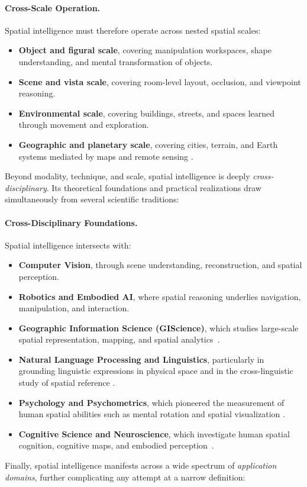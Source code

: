 \paragraph{Cross-Scale Operation.}
Spatial intelligence must therefore operate across nested spatial scales:
\begin{itemize}[leftmargin=2em,itemsep=0.35em]
    \item \textbf{Object and figural scale}, covering manipulation workspaces, shape understanding, and mental transformation of objects.
    \item \textbf{Scene and vista scale}, covering room-level layout, occlusion, and viewpoint reasoning.
    \item \textbf{Environmental scale}, covering buildings, streets, and spaces learned through movement and exploration.
    \item \textbf{Geographic and planetary scale}, covering cities, terrain, and Earth systems mediated by maps and remote sensing \cite{goodchild1992geographical,feng2025survey}.
\end{itemize}
Beyond modality, technique, and scale, spatial intelligence is deeply \emph{cross-disciplinary}.
Its theoretical foundations and practical realizations draw simultaneously from several scientific traditions:



\paragraph{Cross-Disciplinary Foundations.}
Spatial intelligence intersects with:
\begin{itemize}[leftmargin=2em,itemsep=0.35em]
    \item \textbf{Computer Vision}, through scene understanding, reconstruction, and spatial perception.
    \item \textbf{Robotics and Embodied AI}, where spatial reasoning underlies navigation, manipulation, and interaction.
    \item \textbf{Geographic Information Science (GIScience)}, which studies large-scale spatial representation, mapping, and spatial analytics~\cite{goodchild1992geographical,li2025giscience}.
    \item \textbf{Natural Language Processing and Linguistics}, particularly in grounding linguistic expressions in physical space and in the cross-linguistic study of spatial reference \cite{landau1993whence,levinson2003space}.
    \item \textbf{Psychology and Psychometrics}, which pioneered the measurement of human spatial abilities such as mental rotation and spatial visualization \cite{shepard1971mental,uttal2013malleability}.
    \item \textbf{Cognitive Science and Neuroscience}, which investigate human spatial cognition, cognitive maps, and embodied perception~\cite{tolman1948cognitive,stachenfeld2017hippocampus}.
\end{itemize}
Finally, spatial intelligence manifests across a wide spectrum of \emph{application domains}, further complicating any attempt at a narrow definition:



